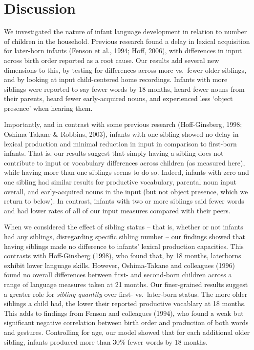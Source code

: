\documentclass[
  english,
  man,floatsintext]{apa6}
\begin{document}
\hypertarget{discussion}{%
\section{Discussion}\label{discussion}}

We investigated the nature of infant language development in relation to number of children in the household. Previous research found a delay in lexical acquisition for later-born infants (Fenson et al., 1994; Hoff, 2006), with differences in input across birth order reported as a root cause. Our results add several new dimensions to this, by testing for differences across more vs.~fewer older siblings, and by looking at input child-centered home recordings. Infants with more siblings were reported to say fewer words by 18 months, heard fewer nouns from their parents, heard fewer early-acquired nouns, and experienced less `object presence' when hearing them.

Importantly, and in contrast with some previous research (Hoff-Ginsberg, 1998; Oshima-Takane \& Robbins, 2003), infants with one sibling showed no delay in lexical production and minimal reduction in input in comparison to first-born infants. That is, our results suggest that simply having a sibling does not contribute to input or vocabulary differences across children (as measured here), while having more than one siblings seems to do so. Indeed, infants with zero and one sibling had similar results for productive vocabulary, parental noun input overall, and early-acquired nouns in the input (but not object presence, which we return to below). In contrast, infants with two or more siblings said fewer words and had lower rates of all of our input measures compared with their peers.

When we considered the effect of sibling status -- that is, whether or not infants had any siblings, disregarding specific sibling number -- our findings showed that having siblings made no difference to infants' lexical production capacities. This contrasts with Hoff-Ginsberg (1998), who found that, by 18 months, laterborns exhibit lower language skills. However, Oshima-Takane and colleagues (1996) found no overall differences between first- and second-born children across a range of language measures taken at 21 months. Our finer-grained results suggest a greater role for \emph{sibling quantity} over first- vs.~later-born status. The more older siblings a child had, the lower their reported productive vocablary at 18 months. This adds to findings from Fenson and colleagues (1994), who found a weak but significant negative correlation between birth order and production of both words and gestures. Controlling for age, our model showed that for each additional older sibling, infants produced more than 30\% fewer words by 18 months.
\end{document}
